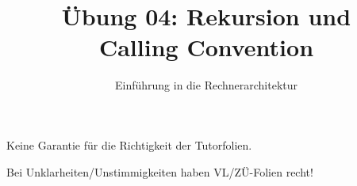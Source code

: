 


\lstset{        basicstyle=\ttfamily,
	showstringspaces=false,
	tabsize=4,
	breaklines=true,
	breakatwhitespace=false,
	frame=single}

\title{Übung 04: Rekursion und \\Calling Convention}
\subtitle{Einführung in die Rechnerarchitektur}
\date{}



\maketitle

\begin{frame}[c, fragile]{}{}
	\begin{center}
		\LARGE  Keine Garantie für die Richtigkeit der Tutorfolien.

		\Large Bei Unklarheiten/Unstimmigkeiten haben VL/ZÜ-Folien recht!
	\end{center}
\end{frame}


